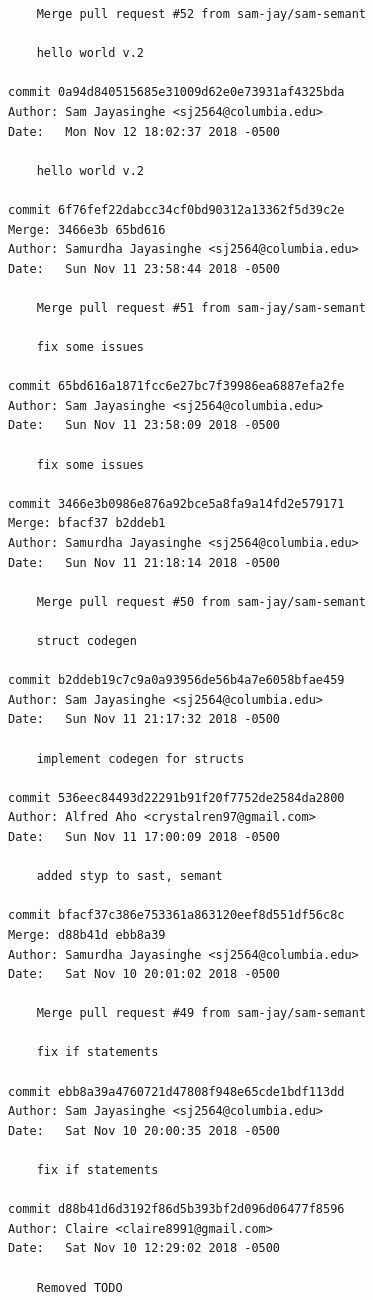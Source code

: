 \documentclass[12pt]{article}
\begin{document}
\begin{lstlisting}
    Merge pull request #52 from sam-jay/sam-semant
    
    hello world v.2

commit 0a94d840515685e31009d62e0e73931af4325bda
Author: Sam Jayasinghe <sj2564@columbia.edu>
Date:   Mon Nov 12 18:02:37 2018 -0500

    hello world v.2

commit 6f76fef22dabcc34cf0bd90312a13362f5d39c2e
Merge: 3466e3b 65bd616
Author: Samurdha Jayasinghe <sj2564@columbia.edu>
Date:   Sun Nov 11 23:58:44 2018 -0500

    Merge pull request #51 from sam-jay/sam-semant
    
    fix some issues

commit 65bd616a1871fcc6e27bc7f39986ea6887efa2fe
Author: Sam Jayasinghe <sj2564@columbia.edu>
Date:   Sun Nov 11 23:58:09 2018 -0500

    fix some issues

commit 3466e3b0986e876a92bce5a8fa9a14fd2e579171
Merge: bfacf37 b2ddeb1
Author: Samurdha Jayasinghe <sj2564@columbia.edu>
Date:   Sun Nov 11 21:18:14 2018 -0500

    Merge pull request #50 from sam-jay/sam-semant
    
    struct codegen

commit b2ddeb19c7c9a0a93956de56b4a7e6058bfae459
Author: Sam Jayasinghe <sj2564@columbia.edu>
Date:   Sun Nov 11 21:17:32 2018 -0500

    implement codegen for structs

commit 536eec84493d22291b91f20f7752de2584da2800
Author: Alfred Aho <crystalren97@gmail.com>
Date:   Sun Nov 11 17:00:09 2018 -0500

    added styp to sast, semant

commit bfacf37c386e753361a863120eef8d551df56c8c
Merge: d88b41d ebb8a39
Author: Samurdha Jayasinghe <sj2564@columbia.edu>
Date:   Sat Nov 10 20:01:02 2018 -0500

    Merge pull request #49 from sam-jay/sam-semant
    
    fix if statements

commit ebb8a39a4760721d47808f948e65cde1bdf113dd
Author: Sam Jayasinghe <sj2564@columbia.edu>
Date:   Sat Nov 10 20:00:35 2018 -0500

    fix if statements

commit d88b41d6d3192f86d5b393bf2d096d06477f8596
Author: Claire <claire8991@gmail.com>
Date:   Sat Nov 10 12:29:02 2018 -0500

    Removed TODO


\end{lstlisting}
\end{document}
